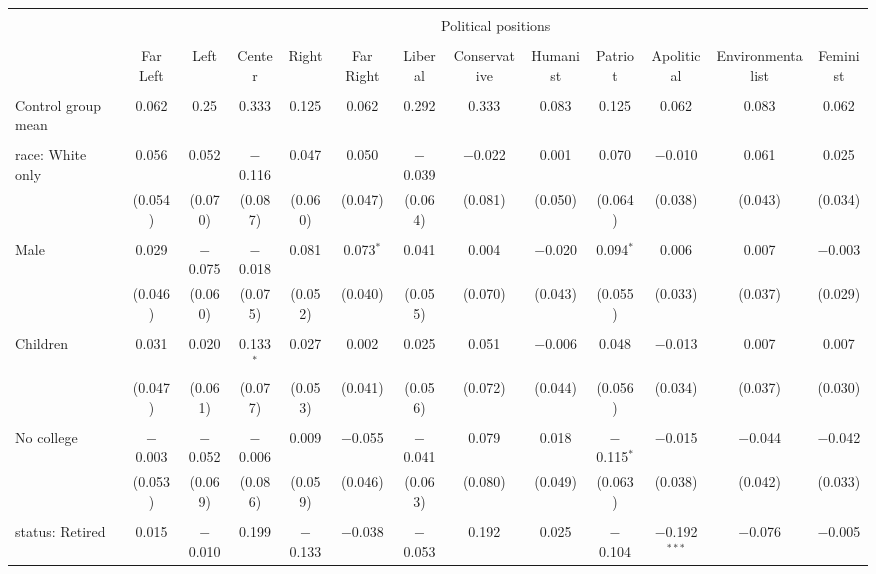 
\begin{tabular}{@{\extracolsep{5pt}}lcccccccccccc} 
\\[-1.8ex]\hline 
\hline \\[-1.8ex] 
 & \multicolumn{12}{c}{Political positions} \\ 
\cline{2-13} 
\\[-1.8ex] & Far Left & Left & Center & Right & Far Right & Liberal & Conservative & Humanist & Patriot & Apolitical & Environmentalist & Feminist \\ 
\hline \\[-1.8ex] 
 Control group mean & 0.062 & 0.25 & 0.333 & 0.125 & 0.062 & 0.292 & 0.333 & 0.083 & 0.125 & 0.062 & 0.083 & 0.062  \\ \hline \\[-1.8ex] race: White only & 0.056 & 0.052 & $-$0.116 & 0.047 & 0.050 & $-$0.039 & $-$0.022 & 0.001 & 0.070 & $-$0.010 & 0.061 & 0.025 \\ 
  & (0.054) & (0.070) & (0.087) & (0.060) & (0.047) & (0.064) & (0.081) & (0.050) & (0.064) & (0.038) & (0.043) & (0.034) \\ 
  & & & & & & & & & & & & \\ 
 Male & 0.029 & $-$0.075 & $-$0.018 & 0.081 & 0.073$^{*}$ & 0.041 & 0.004 & $-$0.020 & 0.094$^{*}$ & 0.006 & 0.007 & $-$0.003 \\ 
  & (0.046) & (0.060) & (0.075) & (0.052) & (0.040) & (0.055) & (0.070) & (0.043) & (0.055) & (0.033) & (0.037) & (0.029) \\ 
  & & & & & & & & & & & & \\ 
 Children & 0.031 & 0.020 & 0.133$^{*}$ & 0.027 & 0.002 & 0.025 & 0.051 & $-$0.006 & 0.048 & $-$0.013 & 0.007 & 0.007 \\ 
  & (0.047) & (0.061) & (0.077) & (0.053) & (0.041) & (0.056) & (0.072) & (0.044) & (0.056) & (0.034) & (0.037) & (0.030) \\ 
  & & & & & & & & & & & & \\ 
 No college & $-$0.003 & $-$0.052 & $-$0.006 & 0.009 & $-$0.055 & $-$0.041 & 0.079 & 0.018 & $-$0.115$^{*}$ & $-$0.015 & $-$0.044 & $-$0.042 \\ 
  & (0.053) & (0.069) & (0.086) & (0.059) & (0.046) & (0.063) & (0.080) & (0.049) & (0.063) & (0.038) & (0.042) & (0.033) \\ 
  & & & & & & & & & & & & \\ 
 status: Retired & 0.015 & $-$0.010 & 0.199 & $-$0.133 & $-$0.038 & $-$0.053 & 0.192 & 0.025 & $-$0.104 & $-$0.192$^{***}$ & $-$0.076 & $-$0.005 \\ 

\end{tabular}
